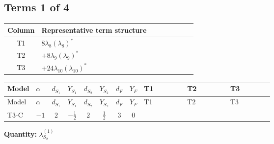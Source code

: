 \documentclass[8pt]{article}
\begin{document}
\begin{landscape}
\subsection*{Terms 1 of 4}
\begin{center}
\begin{tabular}{@{}c >{\raggedright\arraybackslash}p{0.82\linewidth}@{}}
\toprule
Column & Representative term structure \\
\midrule
T1 & \(\displaystyle 8 {\lambda_{8}} \left({\lambda_{8}}\right)^{*}\) \\
\midrule
T2 & \(\displaystyle +8 {\lambda_{9}} \left({\lambda_{9}}\right)^{*}\) \\
\midrule
T3 & \(\displaystyle +24 {\lambda_{10}} \left({\lambda_{10}}\right)^{*}\) \\
\midrule
\bottomrule
\end{tabular}
\end{center}
\smallskip
\tiny
\begin{longtable}{@{}llcccccc >{\raggedright\arraybackslash}p{0.21\linewidth} >{\raggedright\arraybackslash}p{0.21\linewidth} >{\raggedright\arraybackslash}p{0.21\linewidth}@{}}
\toprule
Model & $\alpha$ & $d_{S_1}$ & $Y_{S_1}$ & $d_{S_2}$ & $Y_{S_2}$ & $d_F$ & $Y_F$ & T1 & T2 & T3 \\
\midrule
\endfirsthead
\toprule
Model & $\alpha$ & $d_{S_1}$ & $Y_{S_1}$ & $d_{S_2}$ & $Y_{S_2}$ & $d_F$ & $Y_F$ & T1 & T2 & T3 \\
\midrule
\endhead
T3-C & $-1$ & $2$ & $-\frac{1}{2}$ & $2$ & $\frac{1}{2}$ & $3$ & $0$ & \scriptsize\adjustbox{max width=\linewidth}{$\begin{gathered} 8 {\lambda_{8}} \left({\lambda_{8}}\right)^{*}\end{gathered}$} & \scriptsize\adjustbox{max width=\linewidth}{$\begin{gathered} +8 {\lambda_{9}} \left({\lambda_{9}}\right)^{*}\end{gathered}$} & \scriptsize\adjustbox{max width=\linewidth}{$\begin{gathered} +24 {\lambda_{10}} \left({\lambda_{10}}\right)^{*}\end{gathered}$} \\
\midrule
\bottomrule
\end{longtable}
\clearpage
\noindent\textbf{Quantity: }$\lambda_{S_2}^{(1)}$\par\smallskip

\end{landscape}
\end{document}
